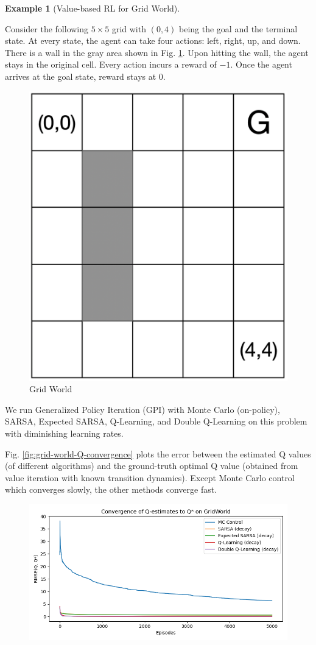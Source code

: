 \documentclass[
]{book}
\theoremstyle{definition}
\theoremstyle{definition}
\newtheorem{example}{Example}[chapter]
\theoremstyle{definition}
\theoremstyle{definition}
\theoremstyle{remark}
\begin{document}
\begin{example}[Value-based RL for Grid World]
\protect\hypertarget{exm:GridWorldMCControl}{}\label{exm:GridWorldMCControl}

Consider the following \(5 \times 5\) grid with \((0,4)\) being the goal and the terminal state. At every state, the agent can take four actions: left, right, up, and down. There is a wall in the gray area shown in Fig. \ref{fig:grid-world}. Upon hitting the wall, the agent stays in the original cell. Every action incurs a reward of \(-1\). Once the agent arrives at the goal state, reward stays at 0.

\begin{figure}

{\centering \includegraphics[width=0.4\linewidth]{images/Value-RL/grid-world} 

}

\caption{Grid World}\label{fig:grid-world}
\end{figure}

We run Generalized Policy Iteration (GPI) with Monte Carlo (on-policy), SARSA, Expected SARSA, Q-Learning, and Double Q-Learning on this problem with diminishing learning rates.

Fig. \ref{fig:grid-world-Q-convergence} plots the error between the estimated Q values (of different algorithms) and the ground-truth optimal Q value (obtained from value iteration with known transition dynamics). Except Monte Carlo control which converges slowly, the other methods converge fast.

\begin{figure}

{\centering \includegraphics[width=0.9\linewidth]{images/Value-RL/Q-Value-Convergence} 

}
\end{figure}
\end{example}
\end{document}
